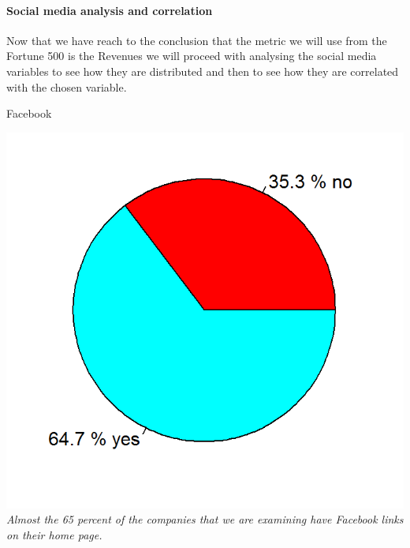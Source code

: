 \documentclass{article}
\begin{document}
\paragraph{Social media analysis and correlation}
Now that we have reach to the conclusion that the metric we will use from the Fortune 500 is the Revenues we will proceed with analysing the social media variables to see how they are distributed and then to see how they are correlated with the chosen variable.\\
\begin{table}[H]
\centering
\caption{Facebook}
\begin{center}
\includegraphics[scale=0.6]{../R/photos/10_facebook_dist.png}   \\
\textit{Almost the 65 percent of the companies that we are examining have Facebook links on their home page.}
\end{center}
\end{table}
\end{document}
